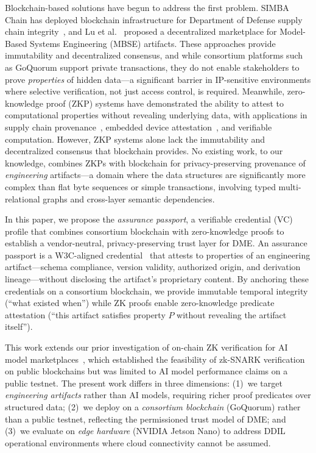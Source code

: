 Blockchain-based solutions have begun to address the first problem.
SIMBA Chain has deployed blockchain infrastructure for Department of Defense supply chain integrity~\cite{simba_chain}, and Lu et al.~\cite{lu2020decentralized} proposed a decentralized marketplace for Model-Based Systems Engineering (MBSE) artifacts.
These approaches provide immutability and decentralized consensus, and while consortium platforms such as GoQuorum support private transactions, they do not enable stakeholders to prove \emph{properties} of hidden data---a significant barrier in IP-sensitive environments where selective verification, not just access control, is required.
Meanwhile, zero-knowledge proof (ZKP) systems have demonstrated the ability to attest to computational properties without revealing underlying data, with applications in supply chain provenance~\cite{zkp_supply_chain2024}, embedded device attestation~\cite{salleras2021zpie}, and verifiable computation.
However, ZKP systems alone lack the immutability and decentralized consensus that blockchain provides.
No existing work, to our knowledge, combines ZKPs with blockchain for privacy-preserving provenance of \emph{engineering} artifacts---a domain where the data structures are significantly more complex than flat byte sequences or simple transactions, involving typed multi-relational graphs and cross-layer semantic dependencies.

In this paper, we propose the \emph{assurance passport}, a verifiable credential (VC) profile that combines consortium blockchain with zero-knowledge proofs to establish a vendor-neutral, privacy-preserving trust layer for DME.
An assurance passport is a W3C-aligned credential~\cite{w3c_vc} that attests to properties of an engineering artifact---schema compliance, version validity, authorized origin, and derivation lineage---without disclosing the artifact's proprietary content.
By anchoring these credentials on a consortium blockchain, we provide immutable temporal integrity (``what existed when'') while ZK proofs enable zero-knowledge predicate attestation (``this artifact satisfies property $P$ without revealing the artifact itself'').

This work extends our prior investigation of on-chain ZK verification for AI model marketplaces~\cite{jagannath2025zksnark}, which established the feasibility of zk-SNARK verification on public blockchains but was limited to AI model performance claims on a public testnet.
The present work differs in three dimensions: (1)~we target \emph{engineering artifacts} rather than AI models, requiring richer proof predicates over structured data; (2)~we deploy on a \emph{consortium blockchain} (GoQuorum) rather than a public testnet, reflecting the permissioned trust model of DME; and (3)~we evaluate on \emph{edge hardware} (NVIDIA Jetson Nano) to address DDIL operational environments where cloud connectivity cannot be assumed.

